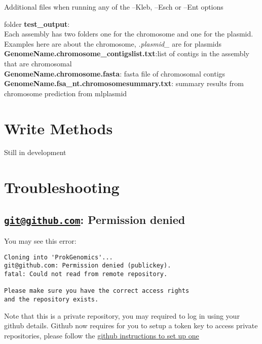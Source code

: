 \documentclass[
]{book}
\begin{document}
Additional files when running any of the --Kleb, --Esch or --Ent options

folder \textbf{test\_output}:\\
Each assembly has two folders one for the chromosome and one for the plasmid. Examples here are about the chromosome, \emph{.plasmid\_} are for plasmids\\
\textbf{GenomeName.chromosome\_contigslist.txt}:list of contigs in the assembly that are chromosomal\\
\textbf{GenomeName.chromosome.fasta}: fasta file of chromosomal contigs\\
\textbf{GenomeName.fsa\_nt.chromosomesummary.txt}: summary results from chromosome prediction from mlplasmid

\hypertarget{write-methods}{%
\chapter{Write Methods}\label{write-methods}}

Still in development

\hypertarget{troubleshooting}{%
\chapter{Troubleshooting}\label{troubleshooting}}

\hypertarget{gitgithub.com-permission-denied}{%
\section{\texorpdfstring{\href{mailto:git@github.com}{\nolinkurl{git@github.com}}: Permission denied}{git@github.com: Permission denied}}\label{gitgithub.com-permission-denied}}

You may see this error:

\begin{verbatim}
Cloning into 'ProkGenomics'...
git@github.com: Permission denied (publickey).
fatal: Could not read from remote repository.

Please make sure you have the correct access rights
and the repository exists.
\end{verbatim}

Note that this is a private repository, you may required to log in using your github details. Github now requires for you to setup a token key to access private repositories, please follow the \href{https://docs.github.com/en/authentication/keeping-your-account-and-data-secure/managing-your-personal-access-tokens}{github instructions to set up one}
\end{document}
